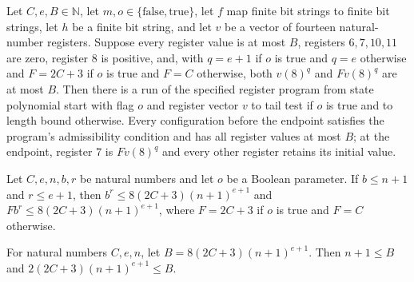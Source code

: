 \begin{lemma}
\label{Complexity.comp_poly_run}
\leanok
{}
Let $C,e,B\in\mathbb{N}$, let $m,o\in\{\mathrm{false},\mathrm{true}\}$, let $f$ map
finite bit strings to finite bit strings, let $h$ be a finite bit string, and let $v$ be
a vector of fourteen natural-number registers. Suppose every register value is at most
$B$, registers $6,7,10,11$ are zero, register $8$ is positive, and, with $q=e+1$ if $o$
is true and $q=e$ otherwise and $F=2C+3$ if $o$ is true and $F=C$ otherwise, both
$v(8)^q$ and $Fv(8)^q$ are at most $B$. Then there is a run of the specified register
program from state polynomial start with flag $o$ and register vector $v$ to tail test
if $o$ is true and to length bound otherwise. Every configuration before the endpoint
satisfies the program's admissibility condition and has all register values at most $B$;
at the endpoint, register $7$ is $Fv(8)^q$ and every other register retains its initial
value.
\end{lemma}

\begin{lemma}
\label{Complexity.comp_power_bound}
\leanok
{}
Let $C,e,n,b,r$ be natural numbers and let $o$ be a Boolean parameter. If $b\le n+1$ and
$r\le e+1$, then $b^r\le 8(2C+3)(n+1)^{e+1}$ and $F b^r\le 8(2C+3)(n+1)^{e+1}$, where
$F=2C+3$ if $o$ is true and $F=C$ otherwise.
\end{lemma}

\begin{lemma}
\label{Complexity.comp_bound_room}
\leanok
{}
For natural numbers $C,e,n$, let $B=8(2C+3)(n+1)^{e+1}$. Then $n+1\le B$ and
$2(2C+3)(n+1)^{e+1}\le B$.
\end{lemma}

